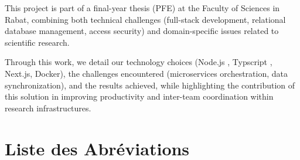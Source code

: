 \documentclass[12pt]{rapportPfe}
\begin{document}
This project is part of a final-year thesis (PFE) at the Faculty of Sciences in Rabat, combining both technical challenges (full-stack development, relational database management, access security) and domain-specific issues related to scientific research.

Through this work, we detail our technology choices (Node.js , Typscript , Next.js, Docker), the challenges encountered (microservices orchestration, data synchronization), and the results achieved, while highlighting the contribution of this solution in improving productivity and inter-team coordination within research infrastructures.

\chapter*{Liste des Abréviations}
\end{document}
